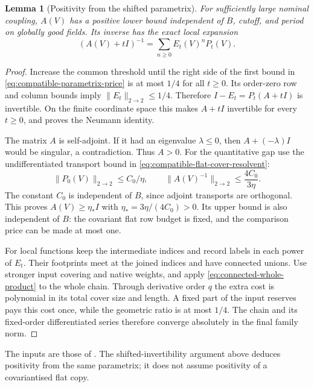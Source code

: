 \documentclass[11pt,reqno]{amsart}
\numberwithin{equation}{section}
\newtheorem{lemma}[theorem]{Lemma}
\theoremstyle{definition}
\theoremstyle{remark}
\begin{document}
\begin{lemma}[Positivity from the shifted parametrix]
\label{lem:compatible-positive-Hessian}
For sufficiently large nominal coupling,
\(A(V)\) has a positive lower bound independent
of \(B\), cutoff, and period on globally good
fields. Its inverse has the exact local expansion
\begin{equation}
              (A(V)+tI)^{-1}
                         =\sum_{n\ge0}E_t(V)^nP_t(V).
 \label{eq:compatible-Neumann-inverse}
\end{equation}
\end{lemma}
\begin{proof}
Increase the common threshold until the
right side of the first bound in
\eqref{eq:compatible-parametrix-price}
is at most \(1/4\) for all \(t\ge0\).
Its order-zero row and column bounds imply
\(\|E_t\|_{2\to2}\le1/4\).
Therefore \(I-E_t=P_t(A+tI)\) is invertible.
On the finite coordinate space this makes
\(A+tI\) invertible for every \(t\ge0\),
and proves the Neumann identity.

The matrix \(A\) is self-adjoint.
If it had an eigenvalue \(\lambda\le0\),
then \(A+(-\lambda)I\) would be singular,
a contradiction.
Thus \(A>0\).
For the quantitative gap use the
undifferentiated transport bound in
\eqref{eq:compatible-flat-cover-resolvent}:
\[
          \|P_0(V)\|_{2\to2}\le C_0/\eta ,
          \qquad
          \|A(V)^{-1}\|_{2\to2}
                           \le\frac{4C_0}{3\eta}.
\]
The constant \(C_0\) is independent of \(B\),
since adjoint transports are orthogonal.
This proves \(A(V)\ge\eta_*I\) with
\(\eta_*=3\eta/(4C_0)>0\).
Its upper bound is also independent of
\(B\): the covariant flat row budget is
fixed, and the comparison price can be
made at most one.

For local functions keep the intermediate
indices and record labels in each power
of \(E_t\). Their footprints meet at the
joined indices and have connected unions.
Use stronger input covering and native
weights, and apply
\eqref{eq:connected-whole-product} to the
whole chain. Through derivative order \(q\)
the extra cost is polynomial in its total
cover size and length.
A fixed part of the input reserves pays
this cost once, while the geometric ratio
is at most \(1/4\).
The chain and its fixed-order differentiated
series therefore converge absolutely in
the final family norm.
\end{proof}

The inputs are those of
\cite[Section~25.4, pp.~132--134]{Main}.
The shifted-invertibility argument above
deduces positivity from the same parametrix;
it does not assume positivity of a
covariantised flat copy.
\end{document}
